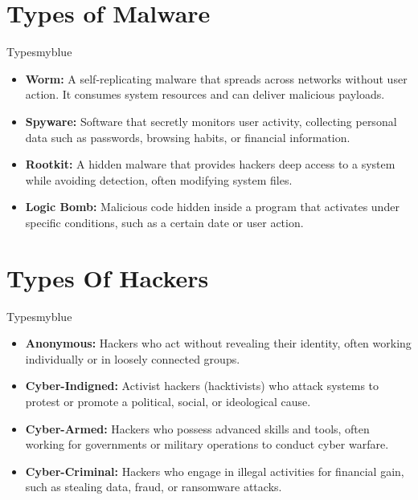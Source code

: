 \vspace{0.75cm}


\section{Types of Malware}
\begin{prettyBox}{Types}{myblue}
\begin{itemize}
    \item \textbf{Worm:} A self-replicating malware that spreads across
networks without user action. It consumes system resources and can deliver 
malicious payloads.
    \item \textbf{Spyware:} Software that secretly monitors user activity, 
collecting personal data such as passwords, browsing habits, or financial 
information.
    \item \textbf{Rootkit:} A hidden malware that provides hackers deep access 
to a system while avoiding detection, often modifying system files.
    \item \textbf{Logic Bomb:} Malicious code hidden inside a program that 
activates under specific conditions, such as a certain date or user action.
\end{itemize}
\end{prettyBox}

\vspace{0.75cm}

\section{Types Of Hackers}
\begin{prettyBox}{Types}{myblue}
\begin{itemize}
    \item \textbf{Anonymous:} Hackers who act without revealing their identity, often working individually or in loosely connected groups.
    \item \textbf{Cyber-Indigned:} Activist hackers (hacktivists) who attack systems to protest or promote a political, social, or ideological cause.
    \item \textbf{Cyber-Armed:} Hackers who possess advanced skills and tools, often working for governments or military operations to conduct cyber warfare.
    \item \textbf{Cyber-Criminal:} Hackers who engage in illegal activities for financial gain, such as stealing data, fraud, or ransomware attacks.
\end{itemize}
\end{prettyBox}


